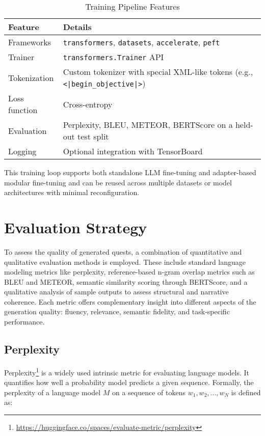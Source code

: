 \begin{table}[H]
  \centering
  \scriptsize
  \renewcommand{\arraystretch}{1.3}
  \begin{tabularx}{0.95\textwidth}{
    >{\raggedright\arraybackslash}p{5cm}
    >{\centering\arraybackslash}X
  }
    \toprule
    \textbf{Feature} & \textbf{Details} \\
    \midrule
    Frameworks & \texttt{transformers}, \texttt{datasets}, \texttt{accelerate}, \texttt{peft} \\
    Trainer & \texttt{transformers.Trainer} API \\
    Tokenization & Custom tokenizer with special XML-like tokens (e.g., \texttt{<|begin\_objective|>}) \\
    Loss function & Cross-entropy \\
    Evaluation & Perplexity, BLEU, METEOR, BERTScore on a held-out test split \\
    Logging & Optional integration with TensorBoard \\
    \bottomrule
  \end{tabularx}
  \caption{Training Pipeline Features}
\end{table}

This training loop supports both standalone LLM fine-tuning and adapter-based modular
fine-tuning and can be reused across multiple datasets or model architectures with
minimal reconfiguration.

\section{Evaluation Strategy}

To assess the quality of generated quests, a combination of quantitative and qualitative
evaluation methods is employed. These include standard language modeling metrics like
perplexity, reference-based n-gram overlap metrics such as BLEU and METEOR, semantic
similarity scoring through BERTScore, and a qualitative analysis of sample outputs to
assess structural and narrative coherence. Each metric offers complementary insight into
different aspects of the generation quality: fluency, relevance, semantic fidelity, and task-specific
performance.

\subsection{Perplexity}

Perplexity\footnote{\url{https://huggingface.co/spaces/evaluate-metric/perplexity}} is a widely used intrinsic metric for evaluating language models. It quantifies
how well a probability model predicts a given sequence. Formally, the perplexity of a
language model \( M \) on a sequence of tokens \( w_1, w_2, ..., w_N \) is defined as:

